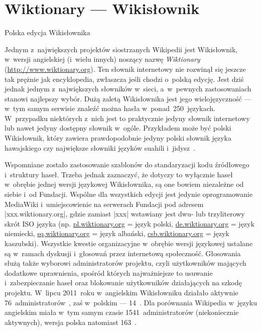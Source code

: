\section{Wiktionary --- Wikisłownik}
\begin{illustration}
	\caption{Polska edycja Wikisłownika}
\end{illustration}
Jednym z~największych projektów siostrzanych Wikipedii jest Wikisłownik, w~wersji angielskiej (i~wielu innych) noszący nazwę \emph{Wiktionary} (\url{http://www.wiktionary.org}). Ten słownik internetowy nie rozwinął się jeszcze tak prężnie jak encyklopedia, zwłaszcza jeśli chodzi o~polską edycję. Jest dziś jednak jednym z~największych słowników w~sieci, a~w~pewnych zastosowaniach stanowi najlepszy wybór. Dużą zaletą Wikisłownika jest jego wielojęzyczność --- w~tym samym serwisie znaleźć można hasła w~ponad~250~językach. W~przypadku niektórych z~nich jest to praktycznie jedyny słownik internetowy lub nawet jedyny dostępny słownik w~ogóle. Przykładem może być polski Wikisłownik, który zawiera prawdopodobnie jedyny polski słownik języka hawajskiego czy największe słowniki języków suahili i~jidysz~\cite{wikt:dlaczego}.

Wspomniane zostało zastosowanie szablonów do standaryzacji kodu źródłowego i~struktury haseł. Trzeba jednak zaznaczyć, że dotyczy to wyłącznie haseł w~obrębie jednej wersji językowej Wikisłownika, są one bowiem niezależne od siebie i~od Fundacji. Wspólne dla wszystkich edycji jest jedynie oprogramowanie MediaWiki i~umiejscowienie na serwerach Fundacji pod adresem \kod|xxx.wiktionary.org|, gdzie zamiast \kod|xxx| wstawiany jest dwu- lub trzyliterowy skrót ISO języka (np. \url{pl.wiktionary.org} = język polski, \url{de.wiktionary.org} = język niemiecki, \url{sq.wiktionary.org} = język albański, \url{csb.wiktionary.org} = język kaszubski). Wszystkie kwestie organizacyjne w~obrębie wersji językowej ustalane są w~ramach dyskusji i~głosowań przez internetową społeczność. Głosowania służą także wyborowi administratorów projektu, czyli użytkowników mających dodatkowe uprawnienia, spośród których najważniejsze to usuwanie i~zabezpieczanie haseł oraz blokowanie użytkowników działających na szkodę projektu. W~lipcu 2011~roku w~angielskim Wikisłowniku działało aktywnie 76~administratorów~\cite{enwikt:admin}, zaś w~polskim --- 14~\cite{wikt:admin}. Dla porównania Wikipedia w~języku angielskim miała w~tym samym czasie 1541~administratorów (niekoniecznie aktywnych), wersja polska natomiast 163~\cite{wiki:admin}.

